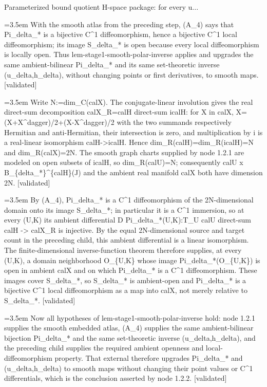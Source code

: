 \documentclass{article}
\newcommand{\step}[1]{\par\noindent\hangindent=3.5em\hangafter=1%
  \makebox[3.5em][l]{\textbf{#1.}}}
\newcommand{\steptag}[1]{\hfill{\small\textsf{[#1]}}}
\begin{document}
\begin{proofbox}{Parameterized bound quotient H-space package: for every u...}
\step{1.2.2} With the smooth atlas from the preceding step, (A\_4) says that Pi\_delta\_* is a bijective C\textasciicircum{}1 diffeomorphism, hence a bijective C\textasciicircum{}1 local diffeomorphism; its image S\_delta\_* is open because every local diffeomorphism is locally open. Thus lem-stage1-smooth-polar-inverse applies and upgrades the same ambient-bilinear Pi\_delta\_* and its same set-theoretic inverse (u\_delta,h\_delta), without changing points or first derivatives, to smooth maps. \steptag{validated} \\[6pt]
\step{1.2.2.1} Write N:=dim\_C(calX).  The conjugate-linear involution gives the real direct-sum decomposition calX\_R=calH direct-sum icalH: for X in calX, X=(X+X\textasciicircum{}dagger)/2+(X-X\textasciicircum{}dagger)/2 with the two summands respectively Hermitian and anti-Hermitian, their intersection is zero, and multiplication by i is a real-linear isomorphism calH->icalH.  Hence dim\_R(calH)=dim\_R(icalH)=N and dim\_R(calX)=2N.  The smooth graph charts supplied by node 1.2.1 are modeled on open subsets of icalH, so dim\_R(calU)=N; consequently calU x B\_\{delta\_*\}\textasciicircum{}\{calH\}(J) and the ambient real manifold calX both have dimension 2N. \steptag{validated} \\[4pt]
\step{1.2.2.2} By (A\_4), Pi\_delta\_* is a C\textasciicircum{}1 diffeomorphism of the 2N-dimensional domain onto its image S\_delta\_*; in particular it is a C\textasciicircum{}1 immersion, so at every (U,K) its ambient differential D Pi\_delta\_*(U,K):T\_U calU direct-sum calH -> calX\_R is injective.  By the equal 2N-dimensional source and target count in the preceding child, this ambient differential is a linear isomorphism.  The finite-dimensional inverse-function theorem therefore supplies, at every (U,K), a domain neighborhood O\_\{U,K\} whose image Pi\_delta\_*(O\_\{U,K\}) is open in ambient calX and on which Pi\_delta\_* is a C\textasciicircum{}1 diffeomorphism.  These images cover S\_delta\_*, so S\_delta\_* is ambient-open and Pi\_delta\_* is a bijective C\textasciicircum{}1 local diffeomorphism as a map into calX, not merely relative to S\_delta\_*. \steptag{validated} \\[4pt]
\step{1.2.2.3} Now all hypotheses of lem-stage1-smooth-polar-inverse hold: node 1.2.1 supplies the smooth embedded atlas, (A\_4) supplies the same ambient-bilinear bijection Pi\_delta\_* and the same set-theoretic inverse (u\_delta,h\_delta), and the preceding child supplies the required ambient openness and local-diffeomorphism property.  That external therefore upgrades Pi\_delta\_* and (u\_delta,h\_delta) to smooth maps without changing their point values or C\textasciicircum{}1 differentials, which is the conclusion asserted by node 1.2.2. \steptag{validated} \\[4pt]

\end{proofbox}
\end{document}
